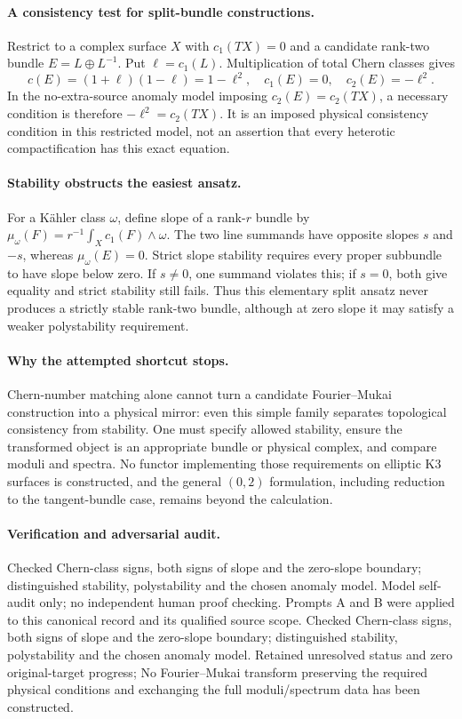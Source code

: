 \documentclass[11pt]{article}
\begin{document}
\paragraph{A consistency test for split-bundle constructions.} Restrict to a complex surface $X$ with $c_1(TX)=0$ and a candidate rank-two bundle $E=L\oplus L^{-1}$. Put $\ell=c_1(L)$. Multiplication of total Chern classes gives
\[
 c(E)=(1+\ell)(1-\ell)=1-\ell^2,\quad c_1(E)=0,\quad c_2(E)=-\ell^2.
\]
In the no-extra-source anomaly model imposing $c_2(E)=c_2(TX)$, a necessary condition is therefore $-\ell^2=c_2(TX)$. It is an imposed physical consistency condition in this restricted model, not an assertion that every heterotic compactification has this exact equation.

\paragraph{Stability obstructs the easiest ansatz.} For a Kähler class $\omega$, define slope of a rank-$r$ bundle by $\mu_\omega(F)=r^{-1}\int_Xc_1(F)\wedge\omega$. The two line summands have opposite slopes $s$ and $-s$, whereas $\mu_\omega(E)=0$. Strict slope stability requires every proper subbundle to have slope below zero. If $s\ne0$, one summand violates this; if $s=0$, both give equality and strict stability still fails. Thus this elementary split ansatz never produces a strictly stable rank-two bundle, although at zero slope it may satisfy a weaker polystability requirement.

\paragraph{Why the attempted shortcut stops.} Chern-number matching alone cannot turn a candidate Fourier--Mukai construction into a physical mirror: even this simple family separates topological consistency from stability. One must specify allowed stability, ensure the transformed object is an appropriate bundle or physical complex, and compare moduli and spectra. No functor implementing those requirements on elliptic K3 surfaces is constructed, and the general $(0,2)$ formulation, including reduction to the tangent-bundle case, remains beyond the calculation.

\paragraph{Verification and adversarial audit.}
Checked Chern-class signs, both signs of slope and the zero-slope boundary; distinguished stability, polystability and the chosen anomaly model. Model self-audit only; no independent human proof checking. Prompts A and B were applied to this canonical record and its qualified source scope. Checked Chern-class signs, both signs of slope and the zero-slope boundary; distinguished stability, polystability and the chosen anomaly model. Retained unresolved status and zero original-target progress; No Fourier--Mukai transform preserving the required physical conditions and exchanging the full moduli/spectrum data has been constructed.
\end{document}
